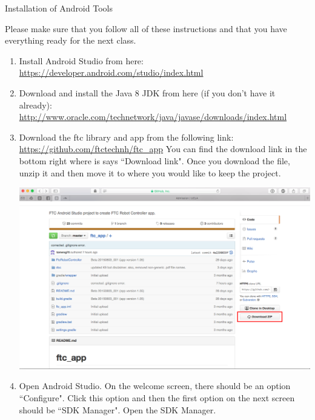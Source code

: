 \documentclass[11pt,fleqn]{article}
\begin{document}
\begin{center}
{\Huge
Installation of Android Tools
}\\
\end{center}

Please make sure that you follow all of these instructions and that you have
everything ready for the next class.

\begin{enumerate}[1.]
\item
Install Android Studio from here: \newline
\url{https://developer.android.com/studio/index.html}
 
\item
    Download and install the Java 8 JDK from here (if you don't have it already):\newline
\url{http://www.oracle.com/technetwork/java/javase/downloads/index.html}

\item
Download the ftc library and app from the following link:\newline
\url{https://github.com/ftctechnh/ftc_app}\newline
You can find the download link in the bottom right where is says ``Download
link". Once you download the file, unzip it and then move it to where you would
like to keep the project. 

\begin{center}
\includegraphics[scale=.3]{Step1}
\end{center}

\item
Open Android Studio. On the welcome screen, there should be an option
``Configure". Click this option and then the first option on the next screen
should be ``SDK Manager". Open the SDK Manager. 


\end{enumerate}
\end{document}
